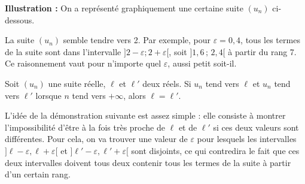 \documentclass[11pt,fleqn]{book} %
\begin{document}
\textbf{Illustration :} On a représenté graphiquement une certaine suite $(u_n)$ ci-dessous. \begin{center}

\end{center}

La suite $(u_n)$ semble tendre vers 2. Par exemple, pour $\varepsilon = 0,4$, tous les termes de la suite sont dans l'intervalle $]2-\varepsilon ; 2+\varepsilon[$, soit $]1,6\,;\, 2,4[$ à partir du rang 7. Ce raisonnement vaut pour n'importe quel $\varepsilon$, aussi petit soit-il.


\begin{proposition}
Soit $(u_n)$ une suite réelle, $\ell$ et $\ell'$ deux réels. Si $u_n$ tend vers $\ell$ et $u_n$ tend vers $\ell'$ lorsque $n$ tend vers $+\infty$, alors $\ell=\ell'$.\end{proposition}

L'idée de la démonstration suivante est assez simple : elle consiste à montrer l'impossibilité d'être à la fois très proche de $\ell$ et de $\ell'$ si ces deux valeurs sont différentes. Pour cela, on va trouver une valeur de $\varepsilon$ pour lesquels les intervalles $] \ell- \varepsilon, \ell+\varepsilon [$ et $] \ell'- \varepsilon, \ell'+\varepsilon [$ sont disjoints, ce qui contredira le fait que ces deux intervalles doivent tous deux contenir tous les termes de la suite à partir d'un certain rang.
\end{document}
